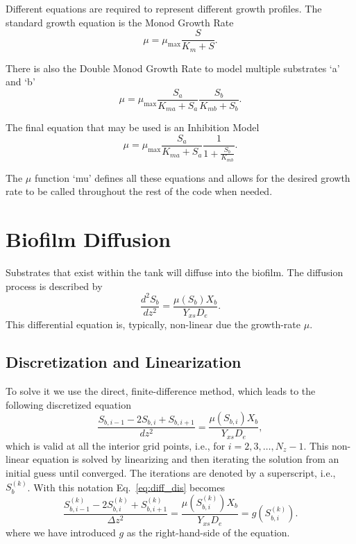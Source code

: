 \documentclass[letterpaper, twoside]{article}
\numberwithin{equation}{section}
\newcommand{\ie}{i.e.}
\begin{document}
Different equations are required to represent different growth profiles. The standard growth equation is the Monod Growth Rate
\begin{equation} \label{eq: MonodGrowthRate}
  \mu=\mu_\mathrm{max} \frac{S}{K_m + S}.
\end{equation}

There is also the Double Monod Growth Rate to model multiple substrates `a' and `b'
\begin{equation} \label{eq: DoubleMonodGrowthRate}
  \mu=\mu_\mathrm{max} \frac{S_a}{K_{ma} + S_a} \frac{S_b}{K_{mb} + S_b}.
\end{equation}

The final equation that may be used is an Inhibition Model
\begin{equation} \label{eq: Inhibition}
  \mu=\mu_\mathrm{max} \frac{S_a}{K_{ma} + S_a} \frac{1}{1 + \frac{S_b}{K_{mb}}}.
\end{equation}

The $\mu$ function `mu' defines all these equations and allows for the desired growth rate to be called throughout the rest of the code when needed.
  

\section{Biofilm Diffusion}
Substrates that exist within the tank will diffuse into the biofilm.  The diffusion process is described by
\begin{equation} \label{eq:diffusion}
  \frac{d^2 S_b}{dz^2} = \frac{\mu(S_b) X_b}{Y_{xs} D_e}.
\end{equation}
This differential equation is, typically, non-linear due the growth-rate $\mu$.

\subsection{Discretization and Linearization}
To solve it we use the direct, finite-difference method, which leads to the following discretized equation
\begin{equation} \label{eq:diff_dis}
  \frac{ S_{b,i-1} - 2 S_{b,i} + S_{b,i+1}}{dz^2} = \frac{\mu(S_{b,i}) X_b}{Y_{xs} D_e},
\end{equation}
which is valid at all the interior grid points, \ie, for $i=2,3,\dots,N_z-1$. 
This non-linear equation is solved by linearizing and then iterating the solution from an initial guess until converged.
The iterations are denoted by a superscript, \ie, $S_{b}^{(k)}$.  With this notation Eq.~\ref{eq:diff_dis} becomes
\begin{equation} \label{eq:diff_dis_iter}
  \frac{ S_{b,i-1}^{(k)} - 2 S_{b,i}^{(k)} + S_{b,i+1}^{(k)}}{\Delta z^2} = \frac{\mu\left(S_{b,i}^{(k)}\right) X_b}{Y_{xs} D_e} =  g\left(S_{b,i}^{(k)}\right).
\end{equation}
where we have introduced $g$ as the right-hand-side of the equation.
\end{document}
